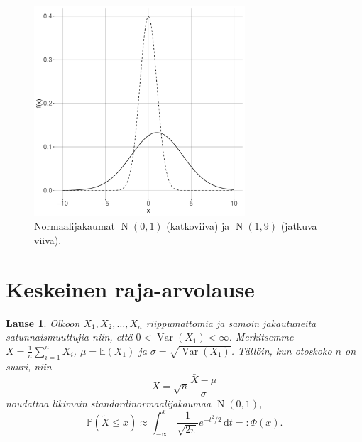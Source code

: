 \documentclass{beamer}
\newtheorem{teoreema}{Lause}
\DeclareMathOperator{\var}{Var}
\DeclareMathOperator{\n}{\mathrm N}
\begin{document}
\begin{frame}
  \begin{center}
    \begin{figure}
      \includegraphics[width=0.7\textwidth, height=0.7\textwidth]{normal}
      \caption{Normaalijakaumat $\n\left(0,1\right)$ (katkoviiva) ja $\n\left(1, 9\right)$ (jatkuva viiva).}
    \end{figure}
  \end{center}
\end{frame}


\section{Keskeinen raja-arvolause}


\begin{frame}
  \begin{teoreema}
    Olkoon $X_1, X_2, \ldots, X_n$ riippumattomia ja samoin jakautuneita
    satunnaismuuttujia niin, että $0 < \var\left(X_1\right) < \infty$.
    Merkitsemme $\bar X = \frac{1}{n}\sum_{i = 1}^n X_i$, $\mu =
    \mathbb{E}\left(X_1\right)$ ja $\sigma = \sqrt{\var\left(X_1\right)}$.
    Tällöin, kun otoskoko $n$ on suuri, niin
    \begin{equation*}
      \tilde X = \sqrt{n}\frac{\bar X - \mu}{\sigma}
    \end{equation*}
    noudattaa likimain standardinormaalijakaumaa $\n\left(0, 1\right)$,
    \pause
    \begin{equation*}
      \mathbb{P}\left(\tilde X \leq x\right) \approx
      \int_{-\infty}^x \frac{1}{\sqrt{2\pi}}e^{-t^2/2}\,\mathrm{d}t =:
      \Phi\left(x\right).
    \end{equation*}
  \end{teoreema}
\end{frame}
\end{document}
